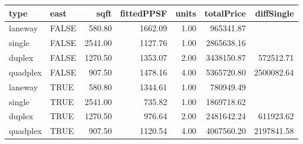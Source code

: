 \begin{tabular}{llrrrrr}
  \hline
type & east & sqft & fittedPPSF & units & totalPrice & diffSingle \\ 
  \hline
laneway & FALSE & 580.80 & 1662.09 & 1.00 & 965341.87 &  \\ 
  single & FALSE & 2541.00 & 1127.76 & 1.00 & 2865638.16 &  \\ 
  duplex & FALSE & 1270.50 & 1353.07 & 2.00 & 3438150.87 & 572512.71 \\ 
  quadplex & FALSE & 907.50 & 1478.16 & 4.00 & 5365720.80 & 2500082.64 \\ 
  laneway & TRUE & 580.80 & 1344.61 & 1.00 & 780949.49 &  \\ 
  single & TRUE & 2541.00 & 735.82 & 1.00 & 1869718.62 &  \\ 
  duplex & TRUE & 1270.50 & 976.64 & 2.00 & 2481642.24 & 611923.62 \\ 
  quadplex & TRUE & 907.50 & 1120.54 & 4.00 & 4067560.20 & 2197841.58 \\ 
   \hline
\end{tabular}
